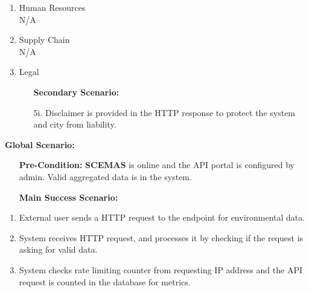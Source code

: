\documentclass[]{article}
\begin{document}
\begin{enumerate}[{\bf BE1.}]
\begin{enumerate}[{\bf VP1.}]
\begin{enumerate}[1.]
			\end{enumerate}
			\begin{itemize}
				\item[] {\bf Secondary Scenario:}
				\item[2i.] HTTP request is not valid. \\
				\hspace{1cm}2i.1. System disregards HTTP request. \\
				\hspace{1cm}2i.2. System responds with not found HTTP response.
				\item[3i.] Rate limit exceeded. \\
				\hspace{1cm}3i.1. System drops the request and does not process it. \\
				\hspace{1cm}3i.2. System returns too many request HTTP response back to user.
			\end{itemize}
		\item Human Resources \\
			N/A
		\item Supply Chain \\
			N/A
		\item Legal
			\begin{itemize}
				\item[] {\bf Secondary Scenario:}
				\item[5i.] Disclaimer is provided in the HTTP response to protect the system and city from liability.
			\end{itemize}
		\end{enumerate}
		{\bf Global Scenario:}
		\begin{itemize}
			\item[] {\bf Pre-Condition:} \textbf{SCEMAS} is online and the API portal is configured by admin. Valid aggregated data is in the system.
			\item[] {\bf Main Success Scenario:}
		\end{itemize}
		\begin{enumerate}[1.]
			\item External user sends a HTTP request to the endpoint for environmental data.
			\item System receives HTTP request, and processes it by checking if the request is asking for valid data.
			\item System checks rate limiting counter from requesting IP address and the API request is counted in the database for metrics.

\end{enumerate}
\end{enumerate}
\end{document}
